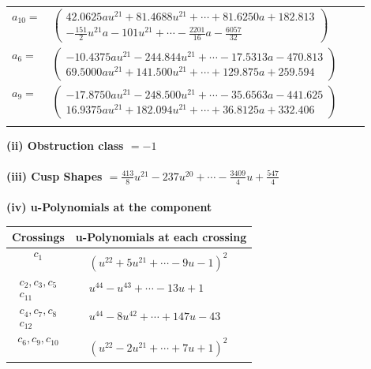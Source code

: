 \documentclass[1p]{elsarticle_modified}
\theoremstyle{definition}
\begin{document}
\begin{tabular}{m{7pt} m{180pt} m{7pt} m{180pt} }
\flushright $a_{10}=$&$\begin{pmatrix}42.0625 a u^{21}+81.4688 u^{21}+\cdots+81.6250 a+182.813\\-\frac{151}{2} u^{21} a-101 u^{21}+\cdots-\frac{2201}{16} a-\frac{6057}{32}\end{pmatrix}$ \\
\flushright $a_{6}=$&$\begin{pmatrix}-10.4375 a u^{21}-244.844 u^{21}+\cdots-17.5313 a-470.813\\69.5000 a u^{21}+141.500 u^{21}+\cdots+129.875 a+259.594\end{pmatrix}$ \\
\flushright $a_{9}=$&$\begin{pmatrix}-17.8750 a u^{21}-248.500 u^{21}+\cdots-35.6563 a-441.625\\16.9375 a u^{21}+182.094 u^{21}+\cdots+36.8125 a+332.406\end{pmatrix}$\\&\end{tabular}
\flushleft \textbf{(ii) Obstruction class $= -1$}\\~\\
\flushleft \textbf{(iii) Cusp Shapes $= \frac{413}{8} u^{21}-237 u^{20}+\cdots-\frac{3409}{4} u+\frac{547}{4}$}\\~\\
\newpage\renewcommand{\arraystretch}{1}
\flushleft \textbf{(iv) u-Polynomials at the component}\newline \\
\begin{tabular}{m{50pt}|m{274pt}}
Crossings & \hspace{64pt}u-Polynomials at each crossing \\
\hline $$\begin{aligned}c_{1}\end{aligned}$$&$\begin{aligned}
&(u^{22}+5 u^{21}+\cdots-9 u-1)^{2}
\end{aligned}$\\
\hline $$\begin{aligned}c_{2},c_{3},c_{5}\\c_{11}\end{aligned}$$&$\begin{aligned}
&u^{44}- u^{43}+\cdots-13 u+1
\end{aligned}$\\
\hline $$\begin{aligned}c_{4},c_{7},c_{8}\\c_{12}\end{aligned}$$&$\begin{aligned}
&u^{44}-8 u^{42}+\cdots+147 u-43
\end{aligned}$\\
\hline $$\begin{aligned}c_{6},c_{9},c_{10}\end{aligned}$$&$\begin{aligned}
&(u^{22}-2 u^{21}+\cdots+7 u+1)^{2}
\end{aligned}$\\
\hline
\end{tabular}\\~\\
\end{document}
